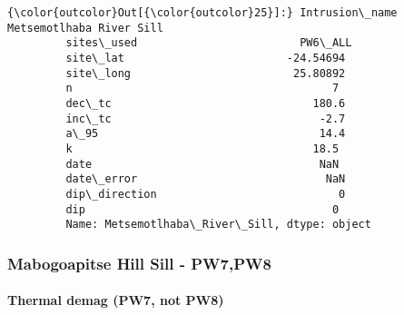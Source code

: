 \documentclass{article}
\begin{document}
            \begin{Verbatim}[commandchars=\\\{\}]
{\color{outcolor}Out[{\color{outcolor}25}]:} Intrusion\_name    Metsemotlhaba River Sill
         sites\_used                         PW6\_ALL
         site\_lat                         -24.54694
         site\_long                         25.80892
         n                                        7
         dec\_tc                               180.6
         inc\_tc                                -2.7
         a\_95                                  14.4
         k                                     18.5
         date                                   NaN
         date\_error                             NaN
         dip\_direction                            0
         dip                                      0
         Name: Metsemotlhaba\_River\_Sill, dtype: object
\end{Verbatim}
        
    \subsubsection{Mabogoapitse Hill Sill -
PW7,PW8}\label{mabogoapitse-hill-sill---pw7pw8}

    \paragraph{Thermal demag (PW7, not
PW8)}\label{thermal-demag-pw7-not-pw8}
\end{document}
